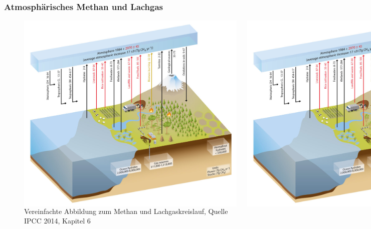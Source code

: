 \begin{frame}
	\frametitle{Atmosphärisches Methan und Lachgas}
	
	
	\begin{figure}
		\begin{columns}
				\includegraphics[width=\linewidth]{bilder/IPCC_Cycles_methane.jpg}
			
				\centering
				\includegraphics[width=\linewidth]{bilder/IPCC_Cycles_methane.jpg}
		\end{columns}
		\caption{Vereinfachte Abbildung zum Methan und Lachgaskreislauf, Quelle IPCC 2014, Kapitel 6}
	\end{figure}


\end{frame}
